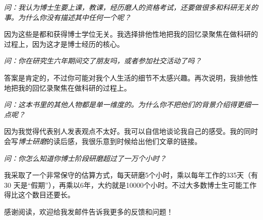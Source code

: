 \documentclass[letter,12pt]{book}
\newcommand{\bookname}{博士研磨}
\begin{document}
\begin{CJK}{UTF8}{gbsn}
\emph{问：我认为博士生要上课，教课，经历磨人的资格考试，还要做很多和科研无关的事。为什么你没有描述其中任何一个呢？}

因为这些是都和获得博士学位无关。我选择排他性地把我的回忆录聚焦在做科研的过程上，因为这才是博士经历的核心。

\emph{问：你在研究生六年期间交了朋友吗，或者参加社交活动了吗？}

答案是肯定的，不过你可能对我个人生活的细节不太感兴趣。再次说明，我排他性地把我的回忆录聚焦在做科研的过程上。

\emph{问：这本书里的其他人物都是单一维度的。为什么你不把他们的背景介绍得更细一点呢？}

因为我觉得代表别人发表观点不太好。我可以自信地谈论我自己的感受。我的同时会写\emph{\bookname}的读后感，我很乐意到时候给出他们文章的链接。

\emph{问：你怎么知道你博士阶段研磨超过了一万个小时？}

我采取了一个非常保守的估算方式，每天研磨5个小时，乘以每年工作的335天（有30 天是“假期”），再乘以6年，大约就是10000个小时。不过大多数博士生可能工作得比这个数目还要长。

感谢阅读，欢迎给我发邮件告诉我更多的反馈和问题！

\clearpage
\clearpage

\end{CJK}
\end{document}
